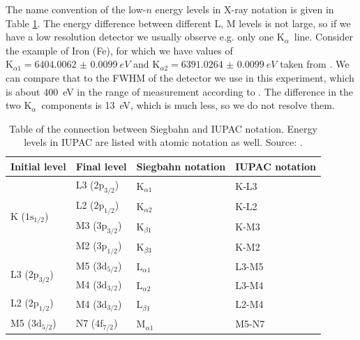 \documentclass[11pt,a4paper,twoside,onecolumn]{article}
\newcommand{\Kalpha}{$\mathrm{K}_\alpha$~}
\begin{document}
The name convention of the low-$n$ energy levels in X-ray notation is given in Table \ref{tab:siegbahn-notation}. The energy difference between different L, M levels is not large, so if we have a low resolution detector we usually observe e.g. only one \Kalpha line. Consider the example of Iron (Fe), for which we have values of $\mathrm{K}_{\alpha 1} = \qty{6404.0062(99)}{eV}$ and $\mathrm{K}_{\alpha 2} = \qty{6391.0264(99)}{eV}$ taken from \cite{Hudson2003}. We can compare that to the FWHM of the detector we use in this experiment, which is about \qty{400}{eV} in the range of measurement according to \cite[Section 6]{xRayManual}. The difference in the two \Kalpha components is \qty{13}{eV}, which is much less, so we do not resolve them.
\begin{table}[!htbp]
    \centering
    \begin{tabular}{@{}llll@{}}
    \toprule
    \multicolumn{1}{c}{Initial level} & \multicolumn{1}{c}{Final level} & \multicolumn{1}{c}{Siegbahn notation} & \multicolumn{1}{c}{IUPAC notation} \\ \midrule
    \multirow{4}{*}{K ($1\mathrm{s}_{1/2}$)}  & L3 ($2\mathrm{p}_{3/2}$) & $\mathrm{K}_{\alpha 1}$ & K-L3  \\
                                              & L2 ($2\mathrm{p}_{1/2}$) & $\mathrm{K}_{\alpha 2}$ & K-L2  \\
                                              & M3 ($3\mathrm{p}_{3/2}$) & $\mathrm{K}_{\beta 1}$  & K-M3  \\
                                              & M2 ($3\mathrm{p}_{1/2}$) & $\mathrm{K}_{\beta 3}$  & K-M2  \\
    \multirow{2}{*}{L3 ($2\mathrm{p}_{3/2}$)} & M5 ($3\mathrm{d}_{5/2}$) & $\mathrm{L}_{\alpha 1}$ & L3-M5 \\
                                              & M4 ($3\mathrm{d}_{3/2}$) & $\mathrm{L}_{\alpha 2}$ & L3-M4 \\
    L2 ($2\mathrm{p}_{1/2}$)                  & M4 ($3\mathrm{d}_{3/2}$) & $\mathrm{L}_{\beta 1}$  & L2-M4 \\
    M5 ($3\mathrm{d}_{5/2}$)                  & N7 ($4\mathrm{f}_{7/2}$) & $\mathrm{M}_{\alpha 1}$ & M5-N7 \\ \bottomrule
    \end{tabular}
    \caption{Table of the connection between Siegbahn and IUPAC notation. Energy levels in IUPAC are listed with atomic notation as well. Source: \cite{Jenkins1991}.}
    \label{tab:siegbahn-notation}
\end{table}
\end{document}
